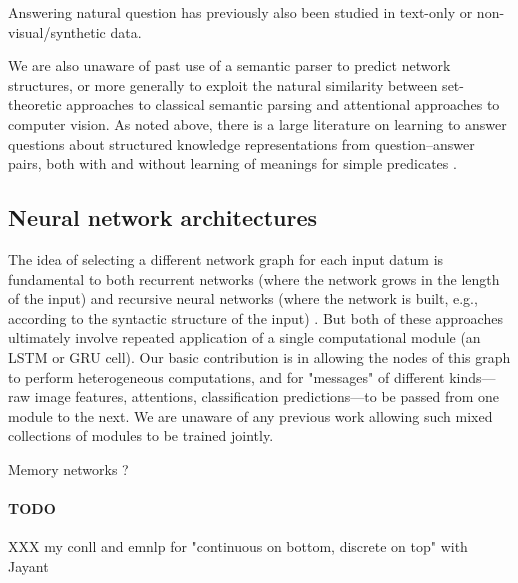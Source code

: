 Answering natural question has previously also been studied in text-only or non-visual/synthetic data.

We are also unaware of past use of a semantic parser to predict network structures, or more generally to exploit the natural similarity between set-theoretic approaches to classical semantic parsing and attentional approaches to computer vision. As noted above, there is a large literature on learning to answer questions about structured knowledge representations from question--answer pairs, both with and without learning of meanings for simple predicates \cite{Liang13DCS,Krish2013Grounded}.


\subsection{Neural network architectures}

The idea of selecting a different network graph for each input datum is fundamental to both recurrent networks (where the network grows in the length of the input) \cite{Elman90RNN} and recursive neural networks (where the network is built, e.g., according to the syntactic structure of the input) \cite{Socher13CVG}. But both of these approaches ultimately involve repeated application of a single computational module (\eg an LSTM \cite{} or GRU \cite{} cell). Our basic contribution is in allowing the nodes of this graph to perform heterogeneous computations, and for "messages" of different kinds---raw image features, attentions, classification predictions---to be passed from one module to the next. We are unaware of any previous work allowing such mixed collections of modules to be trained jointly. 

Memory networks \cite{weston14arxiv}?

\paragraph{TODO}
XXX my conll and emnlp for "continuous on bottom, discrete on top" with Jayant

\cite{Krish2013Grounded,matuszek12icml,kong14cvpr}

